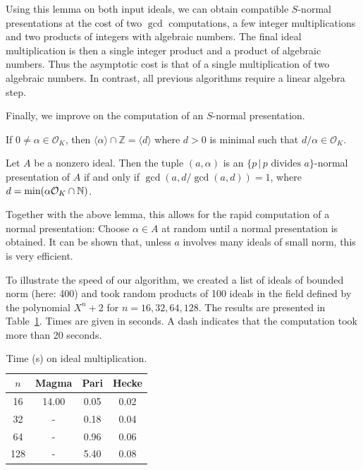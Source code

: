 \documentclass{sig-alternate-05-2015}
\begin{document}
Using this lemma on both input ideals, we can obtain compatible $S$-normal 
presentations at the cost of two $\gcd$ computations, a few integer multiplications and two products of integers with algebraic numbers. The final ideal
multiplication is then a single integer product and a product of
algebraic numbers. Thus the asymptotic cost is that of a single multiplication of two algebraic numbers.
In contrast, all previous algorithms require a linear algebra step.

Finally, we improve on the computation of an $S$-normal presentation.

\begin{lemma}
If $0\ne\alpha\in \mathcal O_K$, then $\langle\alpha\rangle\cap \mathbb Z = \langle d\rangle$ where $d>0$ is minimal such that $d/\alpha\in \mathcal O_K$.
\end{lemma}

\begin{theorem}
Let $A$ be a nonzero ideal. Then the tuple
$(a, \alpha)$ is an $\{p \, | \, p \text{ divides }a\}$-normal presentation of $A$ if and only if
$\gcd(a, {d}/{\gcd(a, d)}) = 1$, where $d = \min(\alpha\mathcal O_K \cap \mathbb{N})$.
\end{theorem}

Together with the above lemma, this allows for the rapid computation of a
normal presentation: Choose $\alpha\in A$ at random until a normal presentation
is obtained. It can be shown that, unless $a$ involves many ideals of small
norm, this is very efficient.

To illustrate the speed of our algorithm, we created a list of ideals of bounded norm (here: 400) and
took random products of 100 ideals in the field
defined by the polynomial $X^n + 2$ for $n=16, 32, 64, 128$.
The results are presented in Table~\ref{tab:ideals}.
Times are given in seconds. A dash indicates that the computation took  more than 20 seconds.

\begin{table}
\center
\caption{Time (s) on ideal multiplication.}
\begin{small}
\setlength{\tabcolsep}{2.5pt}
\renewcommand{\arraystretch}{1.2}
\begin{tabular}{c c c c} \hline
$n$ & Magma & Pari & Hecke  \\ \hline
     16  &  14.00 & 0.05 & 0.02   \\
     32  &   -  &   0.18   &     0.04 \\
     64  &   -  &     0.96   &     0.06    \\
    128  &   -   &     5.40    &       0.08 
\end{tabular}
\label{tab:ideals}
\end{small}
\end{table}
\end{document}
